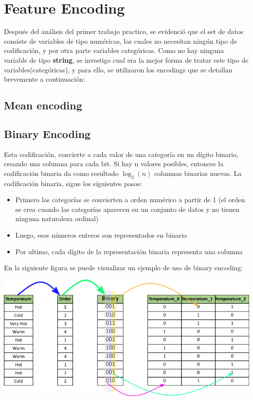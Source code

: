 \documentclass[12pt,a4paper]{article}
\begin{document}
\section{Feature Encoding}
Después del análisis del primer trabajo practico, se evidenció que el set de datos consiste de variables de tipo numéricas, las cuales no necesitan ningún tipo de codificación, y por otra parte variables categóricas. Como no hay ninguna variable de tipo \textbf{string}, se investigo cual era la mejor forma de tratar este tipo de variables(categóricas), y para ello, se utilizaron los encodings que se detallan brevemente a continuación:

\subsection{Mean encoding}


\subsection{Binary Encoding}

Esta codificación, convierte a cada valor de una categoría en un dígito binario, creando una columna para cada bit. Si hay n valores posibles, entonces la codificación binaria da como resultado $\log _{2}(n)$ columnas binarias nuevas.\newline
\newline
La codificación binaria, sigue los siguientes pasos:
\begin{itemize}
    \item Primero las categorías se convierten a orden numérico a partir de 1 (el orden se crea cuando las categorías aparecen en un conjunto de datos y no tienen ninguna naturaleza ordinal)
    \item Luego, esos números enteros son representados en binario
    \item Por ultimo, cada dígito de la representación binaria representa una columna 
\end{itemize}

En la siguiente figura se puede visualizar un ejemplo de uso de binary encoding:

\begin{center}
    \includegraphics[scale=0.5]{imgs/binary-encoding.png}
\end{center}
\end{document}
